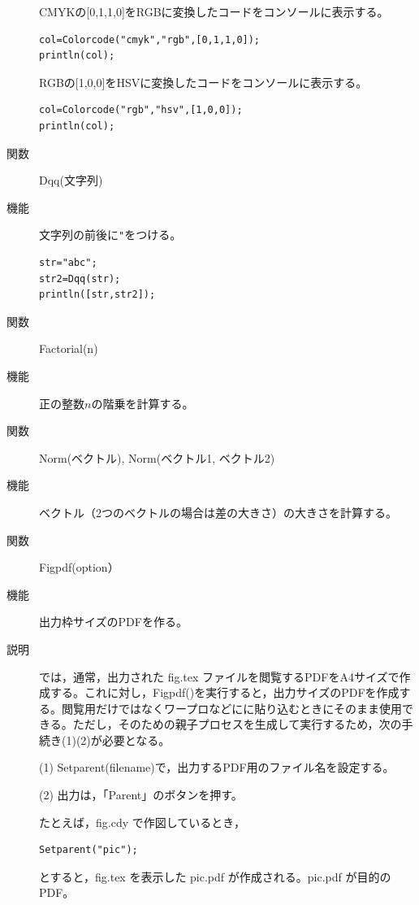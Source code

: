 \documentclass[papersize,a4paper,12pt,uplatex]{jsarticle}
\begin{document}
\begin{description}
CMYKの[0,1,1,0]をRGBに変換したコードをコンソールに表示する。

\begin{verbatim}
col=Colorcode("cmyk","rgb",[0,1,1,0]);
println(col); 
\end{verbatim}

RGBの[1,0,0]をHSVに変換したコードをコンソールに表示する。

\begin{verbatim}
col=Colorcode("rgb","hsv",[1,0,0]);
println(col); 
\end{verbatim}

\vspace{\baselineskip}
\hypertarget{dqq}{}
\item[関数]Dqq(文字列)
\item[機能]文字列の前後に\verb|"|をつける。
\begin{verbatim}
str="abc";
str2=Dqq(str);
println([str,str2]); 
\end{verbatim}

\vspace{\baselineskip}
\hypertarget{factorial}{}
\item[関数]Factorial(n)
\item[機能]正の整数$n$の階乗を計算する。

\vspace{\baselineskip}
\hypertarget{norm}{}
\item[関数]Norm(ベクトル), Norm(ベクトル1, ベクトル2)
\item[機能]ベクトル（2つのベクトルの場合は差の大きさ）の大きさを計算する。

\vspace{\baselineskip}
\hypertarget{figpdf}{}
\item[関数]Figpdf(option）
\item[機能]出力枠サイズのPDFを作る。
\item[説明]\ketcindy では，通常，出力された fig.tex ファイルを閲覧するPDFをA4サイズで作成する。これに対し，Figpdf()を実行すると，出力サイズのPDFを作成する。閲覧用だけではなくワープロなどにに貼り込むときにそのまま使用できる。ただし，そのための親子プロセスを生成して実行するため，次の手続き(1)(2)が必要となる。

\vspace{\baselineskip}
(1) Setparent(filename)で，出力するPDF用のファイル名を設定する。

(2) 出力は，「Parent」のボタンを押す。

\vspace{\baselineskip}
たとえば，fig.cdy で作図しているとき，
\begin{verbatim}
Setparent("pic");
\end{verbatim}
とすると，fig.tex を表示した pic.pdf が作成される。pic.pdf が目的のPDF。


\end{description}
\end{document}
